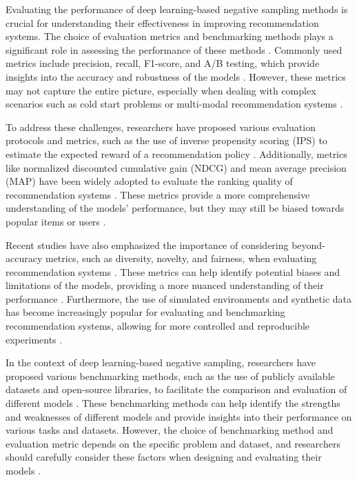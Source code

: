 \documentclass[11pt,a4paper]{article}
\begin{document}
Evaluating the performance of deep learning-based negative sampling methods is crucial for understanding their effectiveness in improving recommendation systems. The choice of evaluation metrics and benchmarking methods plays a significant role in assessing the performance of these methods \cite{doi:10.1587/transinf.2017edr0003}. Commonly used metrics include precision, recall, F1-score, and A/B testing, which provide insights into the accuracy and robustness of the models \cite{doi:10.1145/2507157.2507160}. However, these metrics may not capture the entire picture, especially when dealing with complex scenarios such as cold start problems or multi-modal recommendation systems \cite{doi:10.1145/3240323.3240355}.

To address these challenges, researchers have proposed various evaluation protocols and metrics, such as the use of inverse propensity scoring (IPS) to estimate the expected reward of a recommendation policy \cite{arxiv:1605.04812}. Additionally, metrics like normalized discounted cumulative gain (NDCG) and mean average precision (MAP) have been widely adopted to evaluate the ranking quality of recommendation systems \cite{doi:10.1145/3637528.3671687}. These metrics provide a more comprehensive understanding of the models' performance, but they may still be biased towards popular items or users \cite{doi:10.1145/3450613.3456821}.

Recent studies have also emphasized the importance of considering beyond-accuracy metrics, such as diversity, novelty, and fairness, when evaluating recommendation systems \cite{arxiv:1905.06589}. These metrics can help identify potential biases and limitations of the models, providing a more nuanced understanding of their performance \cite{doi:10.1145/3564284}. Furthermore, the use of simulated environments and synthetic data has become increasingly popular for evaluating and benchmarking recommendation systems, allowing for more controlled and reproducible experiments \cite{doi:10.1145/3511808.3557220}.

In the context of deep learning-based negative sampling, researchers have proposed various benchmarking methods, such as the use of publicly available datasets and open-source libraries, to facilitate the comparison and evaluation of different models \cite{doi:10.1145/3404835.3463245}. These benchmarking methods can help identify the strengths and weaknesses of different models and provide insights into their performance on various tasks and datasets. However, the choice of benchmarking method and evaluation metric depends on the specific problem and dataset, and researchers should carefully consider these factors when designing and evaluating their models \cite{doi:10.1145/3383313.3418479}.
\end{document}
